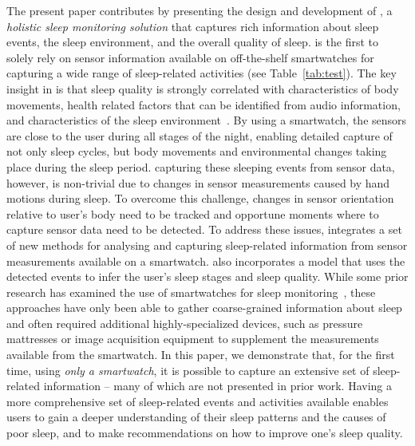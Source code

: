 The present paper contributes by presenting the design and development of \systemname, a \emph{holistic sleep monitoring solution} that
captures rich information about sleep events, the sleep environment, and the overall quality of sleep. \systemname is the first to solely
rely on sensor information available on off-the-shelf smartwatches for capturing a wide range of sleep-related activities (see
Table~\ref{tab:test}). The key insight in {\systemname} is that sleep quality is strongly correlated with characteristics of body
movements, health related factors that can be identified from audio information, and characteristics of the sleep
environment~\cite{shelgikar2016sleep}. By using a smartwatch, the sensors are close to the user during all stages of the night, enabling
detailed capture of not only sleep cycles, but body movements and environmental changes taking place during the sleep period. capturing
these sleeping events from sensor data, however, is non-trivial due to changes in sensor measurements caused by hand motions during sleep.
To overcome this challenge, changes in sensor orientation relative to user's body need to be tracked and opportune moments where to capture
sensor data need to be detected. To address these issues, \systemname integrates a set of new methods for analysing and capturing
sleep-related information from sensor measurements available on a smartwatch. \systemname also incorporates a model that uses the detected
events to infer the user's sleep stages and sleep quality. While some prior research has examined the use of smartwatches for sleep
monitoring~\cite{pombo2016ubisleep,shelgikar2016sleep,haescher2015anomaly,borazio2012combining}, these approaches have only been able to
gather coarse-grained information about sleep and often required additional highly-specialized devices, such as pressure mattresses or
image acquisition equipment to supplement the measurements available from the smartwatch. In this paper, we demonstrate that, for the first
time, using {\em only a smartwatch}, it is possible to capture an extensive set of sleep-related information -- many of which are not
presented in prior work. Having a more comprehensive set of sleep-related events and activities available enables users to gain a deeper
understanding of their sleep patterns and the causes of poor sleep, and to make recommendations on how to improve one's sleep quality.




